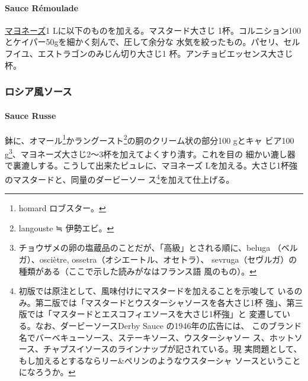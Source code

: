 \begin{recette}
\hypertarget{sauce-remoulade}{%
\paragraph{Sauce Rémoulade}\label{sauce-remoulade}}


\protect\hyperlink{mayonnaise}{マヨネーズ}1
Lに以下のものを加える。マスタード大さじ
1\undemi{}杯。コルニション100とケイパー50gを細かく刻んで、圧して余分な
水気を絞ったもの。パセリ、セルフイユ、エストラゴンのみじん切り大さじ1
杯。アンチョビエッセンス大さじ\undemi{}杯。

\maeaki

\hypertarget{ux30edux30b7ux30a2ux98a8ux30bdux30fcux30b9}{%
\subsubsection{ロシア風ソース}\label{ux30edux30b7ux30a2ux98a8ux30bdux30fcux30b9}}

\hypertarget{sauce-russe-froide}{%
\paragraph{Sauce Russe}\label{sauce-russe-froide}}


鉢に、オマール\footnote{homard ロブスター。}かラングースト\footnote{langouste
  ≒ 伊勢エビ。}の胴のクリーム状の部分100 gとキャ ビア100 g\footnote{チョウザメの卵の塩蔵品のことだが、「高級」とされる順に、beluga
  （ベルガ）、osciètre, ossetra（オシエートル、オセトラ）、
  sevruga（セヴルガ）の種類がある（ここで示した読みがなはフランス語
  風のもの）。}、マヨネーズ大さじ2〜3杯を加えてよくすり潰す。これを目の
細かい漉し器で裏漉しする。こうして出来たピュレに、マヨネーズ
\troisquarts{} Lを加える。大さじ1杯強のマスタードと、同量のダービーソー
ス\footnote{初版では原注として、風味付けにマスタードを加えることを示唆して
  いるのみ。第二版では「マスタードとウスターシャソースを各大さじ1杯
  強」、第三版では「マスタードとエスコフィエソースを大さじ1杯強」と
  変遷している。なお、ダービーソースDerby Sauce の1946年の広告には、
  このブランド名でバーベキューソース、ステーキソース、ウスターシャソー
  ス、ホットソース、チャプスイソースのラインナップが記されている。現
  実問題として、もし加えるとするならリー\&ペリンのようなウスターシャ
  ソースということになろうか。}を加えて仕上げる。


\end{recette}
